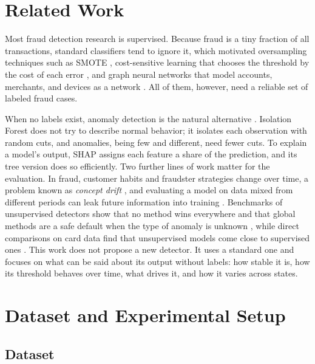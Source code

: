 \documentclass[journal]{IEEEtran}
\begin{document}
\section{Related Work}

Most fraud detection research is supervised. Because fraud is a tiny fraction of all transactions, standard classifiers tend to ignore it, which motivated oversampling techniques such as SMOTE \cite{chawla2002smote}, cost-sensitive learning that chooses the threshold by the cost of each error \cite{danang2025cost}, and graph neural networks that model accounts, merchants, and devices as a network \cite{cheng2024gnn}. All of them, however, need a reliable set of labeled fraud cases.

When no labels exist, anomaly detection is the natural alternative \cite{chandola2009anomaly}. Isolation Forest \cite{liu2008isolation} does not try to describe normal behavior; it isolates each observation with random cuts, and anomalies, being few and different, need fewer cuts. To explain a model's output, SHAP \cite{lundberg2017unified} assigns each feature a share of the prediction, and its tree version \cite{lundberg2020trees} does so efficiently. Two further lines of work matter for the evaluation. In fraud, customer habits and fraudster strategies change over time, a problem known as \textit{concept drift} \cite{gama2014survey,dalpozzolo2018realistic,lucas2020survey}, and evaluating a model on data mixed from different periods can leak future information into training \cite{kaufman2012leakage}. Benchmarks of unsupervised detectors show that no method wins everywhere and that global methods are a safe default when the type of anomaly is unknown \cite{goldstein2016comparative}, while direct comparisons on card data find that unsupervised models come close to supervised ones \cite{niu2019comparison}. This work does not propose a new detector. It uses a standard one and focuses on what can be said about its output without labels: how stable it is, how its threshold behaves over time, what drives it, and how it varies across states.


\section{Dataset and Experimental Setup}

\subsection{Dataset}
\end{document}
